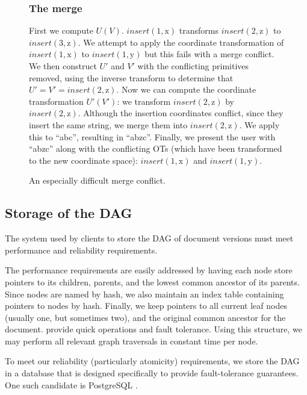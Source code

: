 \documentclass[11pt,titlepage]{article}
\begin{document}
\begin{figure}[h]
\begin{minipage}{\textwidth}
\begin{multicols}{2}
      \subsubsection*{The merge}
      First we compute \(U(V)\). \(insert(1,\mathrm{x})\) transforms
      \(insert(2,\mathrm{z})\) to \(insert(3,\mathrm{z})\).  We
      attempt to apply the coordinate transformation of
      \(insert(1,\mathrm{x})\) to \(insert(1,\mathrm{y})\) but this
      fails with a merge conflict.  We then construct \(U'\) and
      \(V'\) with the conflicting primitives removed, using the
      inverse transform to determine that \(U' = V' = insert(2,
      \mathrm{z})\).  Now we can compute the coordinate transformation
      \(U'(V')\): we transform \(insert(2, \mathrm{z})\) by
      \(insert(2, \mathrm{z})\).  Although the insertion coordinates
      conflict, since they insert the same string, we merge them into
      \(insert(2, \mathrm{z})\).  We apply this to ``abc'', resulting
      in ``abzc''.  Finally, we present the user with ``abzc'' along
      with the conflicting OTs (which have been transformed to the new
      coordinate space): \(insert(1,\mathrm{x})\) and
      \(insert(1,\mathrm{y})\).
    \end{multicols}
  \end{minipage}
  \caption{An especially difficult merge conflict.}
  \label{fig:merge}
\end{figure}

\subsection{Storage of the DAG}

The system used by clients to store the DAG of document versions must
meet performance and reliability requirements.

The performance requirements are easily addressed by having each node
store pointers to its children, parents, and the lowest common
ancestor of its parents.  Since nodes are named by hash, we also
maintain an index table containing pointers to nodes by hash.
Finally, we keep pointers to all current leaf nodes (usually one, but
sometimes two), and the original common ancestor for the document.
provide quick operations and fault tolerance.  Using this structure,
we may perform all relevant graph traversals in constant time per
node.

To meet our reliability (particularly atomicity) requirements, we
store the DAG in a database that is designed specifically to provide
fault-tolerance guarantees.  One such candidate is PostgreSQL
\cite{postgres}.
\end{document}
